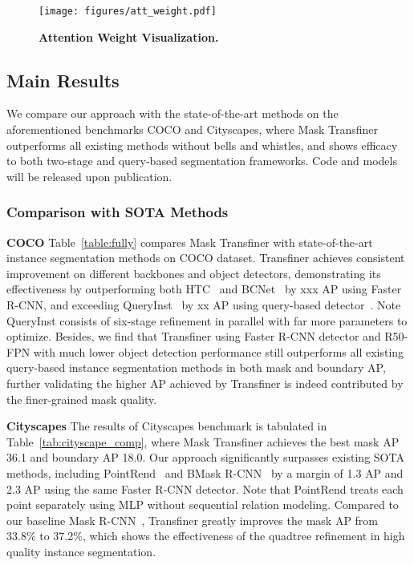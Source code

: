\documentclass[10pt,twocolumn,letterpaper]{article}
\newcommand{\parsection}[1]{\vspace{1mm}\noindent\textbf{#1}}
\begin{document}
\begin{figure}[!t]
	\centering
\texttt{[image: figures/att\_weight.pdf]}
	\caption{\textbf{Attention Weight Visualization.}}
	\label{fig:att_vis}
	\vspace{-0.1in}
\end{figure}

\subsection{Main Results}

We compare our approach with the state-of-the-art methods on the aforementioned benchmarks COCO and Cityscapes, where Mask Transfiner outperforms all existing methods without bells and whistles, and shows efficacy to both two-stage and query-based segmentation frameworks. 
Code and models will be released upon publication.

\subsubsection{Comparison with SOTA Methods}

\parsection{COCO} Table~\ref{table:fully} compares Mask Transfiner with state-of-the-art instance segmentation methods on COCO dataset.
Transfiner achieves consistent improvement on different backbones and object detectors, demonstrating its effectiveness by outperforming both HTC~\cite{chen2019hybrid} and BCNet~\cite{ke2021bcnet} by xxx AP using Faster R-CNN, and exceeding QueryInst~\cite{QueryInst} by xx AP using query-based detector~\cite{carion2020end}. Note QueryInst consists of six-stage refinement in parallel with far more parameters to optimize.
Besides, we find that Transfiner using Faster R-CNN detector and R50-FPN with much lower object detection performance still outperforms all existing query-based instance segmentation methods in both mask and boundary AP, further validating the higher AP achieved by Transfiner is indeed contributed by the finer-grained mask quality.


\parsection{Cityscapes}
The results of Cityscapes benchmark is tabulated in Table~\ref{tab:cityscape_comp}, where Mask Transfiner achieves the best mask AP 36.1 and boundary AP 18.0. Our approach significantly surpasses existing SOTA methods, including PointRend~\cite{kirillov2020pointrend}
and BMask R-CNN~\cite{ChengWHL20} by a margin of 1.3 AP and 2.3 AP using the same Faster R-CNN detector. Note that PointRend treats each point separately using MLP without sequential relation modeling. Compared to our baseline Mask R-CNN~\cite{he2017mask}, Transfiner greatly improves the mask AP from 33.8\% to 37.2\%, which shows the effectiveness of the quadtree refinement in high quality instance segmentation.
\end{document}
